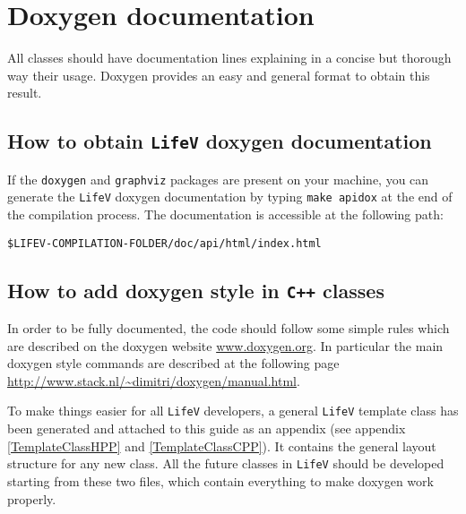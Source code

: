 \documentclass[10p]{article}
\begin{document}
\section{Doxygen documentation} \label{doxygen}
All classes should have documentation lines explaining in a concise but thorough way their usage. Doxygen provides an easy and general format to obtain this result.

\subsection{How to obtain \texttt{LifeV} doxygen documentation} If the \texttt{doxygen} and \texttt{graphviz} packages are present on your machine, you can generate the \texttt{LifeV} doxygen documentation by typing \texttt{make apidox} at the end of the compilation process. The documentation is accessible at the following path: \newline

\texttt{\$LIFEV-COMPILATION-FOLDER/doc/api/html/index.html}\newline

\subsection{How to add doxygen style in \texttt{C++} classes}
In order to be fully documented, the code should follow some simple rules which are described on the doxygen website \url{www.doxygen.org}. In particular the main doxygen style commands are described at the following page \url{http://www.stack.nl/~dimitri/doxygen/manual.html}.

To make things easier for all \texttt{LifeV} developers, a general \texttt{LifeV} template class has been generated and attached to this guide as an appendix (see appendix \ref{TemplateClassHPP} and \ref{TemplateClassCPP}). It contains the general layout structure for any new class. All the future classes in \texttt{LifeV} should be developed starting from these two files, which contain everything to make doxygen work properly.
\end{document}
